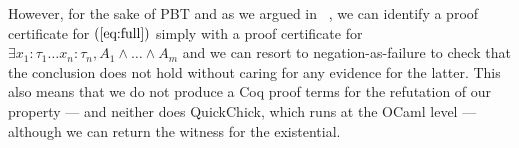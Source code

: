 %
However, for the sake of PBT and as we argued in~\cite{blanco19ppdp}  , we can identify a proof certificate for
$(\ref{eq:full})$ simply with a proof certificate for
$
 \exists x_1 \colon \tau_1\dots x_n \colon \tau_n , A_1\land\dots\land A_m
$
and we can resort to negation-as-failure to check that the conclusion does not hold without caring for any evidence for the latter. This also means that we do not produce a Coq proof terms for the refutation of our property --- and neither does \textsf{QuickChick}, which runs at the OCaml level --- although we can return the witness for the existential.
%



